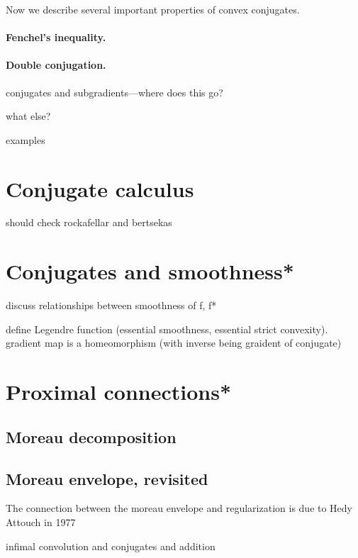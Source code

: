 Now we describe several important properties of convex conjugates. 

\paragraph{Fenchel's inequality.}

\paragraph{Double conjugation.}

conjugates and subgradients---where does this go?

what else?

examples

\section{Conjugate calculus}

should check rockafellar and bertsekas

\section{Conjugates and smoothness*}
\label{sec:conjugates_smoothness}

discuss relationships between smoothness of f, f* 

define Legendre function (essential smoothness, essential strict convexity).
gradient map is a homeomorphism (with inverse being graident of conjugate) 

\section{Proximal connections*}

\subsection{Moreau decomposition}
\label{sec:moreau_decomposition}

\subsection{Moreau envelope, revisited}

The connection between the moreau envelope and regularization is due to Hedy
Attouch in 1977  

infimal convolution and conjugates and addition

